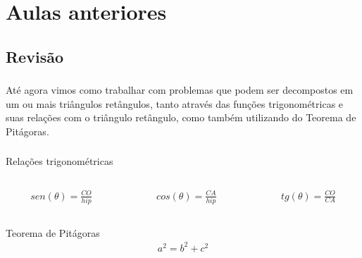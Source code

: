 \documentclass[handout]{beamer}
\begin{document}

\section{Aulas anteriores}
\subsection{Revisão}
\begin{frame}[fragile]\frametitle{\subsecname}
    Até agora vimos como trabalhar com problemas que podem ser decompostos em um 
    ou mais triângulos retângulos, tanto através das funções trigonométricas e 
    suas relações com o triângulo retângulo, como também utilizando do Teorema 
    de Pitágoras.  
\end{frame}


\begin{frame}\frametitle{\subsecname}
    \begin{block}{Relações trigonométricas}
        \begin{columns}
            \begin{column}{0.2\textwidth}
                \begin{align*}
                    sen(\theta) = \frac{CO}{hip}
                \end{align*}
            \end{column} 
            \begin{column}{0.2\textwidth}
                \begin{align*}
                    cos(\theta) = \frac{CA}{hip}
                \end{align*}
            \end{column} 
            \begin{column}{0.2\textwidth}
                \begin{align*}
                    tg(\theta) = \frac{CO}{CA}
                \end{align*}
            \end{column} 

        \end{columns}
    \end{block}

    \begin{block}{Teorema de Pitágoras}
        \begin{align*}
            a^2 = b^2 + c^2
        \end{align*}
    \end{block}


\end{frame}
\end{document}
